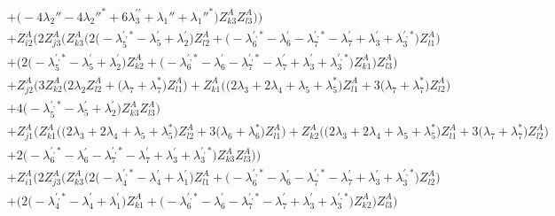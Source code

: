 \begin{align}
 &+\Big(-4 \lambda_2''  -4 \lambda_2''^*  + 6 \lambda^{\prime\prime}_3  + \lambda_1'' + \lambda_1''^*\Big)Z_{{k 3}}^{A} Z_{{l 3}}^{A} \Big)\Big)\nonumber \\ 
 &+Z_{{i 2}}^{A} \Big(2 Z_{{j 3}}^{A} \Big(Z_{{k 3}}^{A} \Big(2 \Big(- \lambda^{{\prime},*}_5  - \lambda^{\prime}_5  + \lambda^{\prime}_2\Big)Z_{{l 2}}^{A}  + \Big(- \lambda^{{\prime},*}_6  - \lambda^{\prime}_6  - \lambda^{{\prime},*}_7  - \lambda^{\prime}_7  + \lambda^{\prime}_3 + \lambda^{{\prime},*}_3\Big)Z_{{l 1}}^{A} \Big)\nonumber \\ 
 &+\Big(2 \Big(- \lambda^{{\prime},*}_5  - \lambda^{\prime}_5  + \lambda^{\prime}_2\Big)Z_{{k 2}}^{A}  + \Big(- \lambda^{{\prime},*}_6  - \lambda^{\prime}_6  - \lambda^{{\prime},*}_7  - \lambda^{\prime}_7  + \lambda^{\prime}_3 + \lambda^{{\prime},*}_3\Big)Z_{{k 1}}^{A} \Big)Z_{{l 3}}^{A} \Big)\nonumber \\ 
 &+Z_{{j 2}}^{A} \Big(3 Z_{{k 2}}^{A} \Big(2 \lambda_2 Z_{{l 2}}^{A}  + \Big(\lambda_7 + \lambda_7^*\Big)Z_{{l 1}}^{A} \Big)+Z_{{k 1}}^{A} \Big(\Big(2 \lambda_3  + 2 \lambda_4  + \lambda_5 + \lambda_5^*\Big)Z_{{l 1}}^{A}  + 3 \Big(\lambda_7 + \lambda_7^*\Big)Z_{{l 2}}^{A} \Big)\nonumber \\ 
 &+4 \Big(- \lambda^{{\prime},*}_5  - \lambda^{\prime}_5  + \lambda^{\prime}_2\Big)Z_{{k 3}}^{A} Z_{{l 3}}^{A} \Big)\nonumber \\ 
 &+Z_{{j 1}}^{A} \Big(Z_{{k 1}}^{A} \Big(\Big(2 \lambda_3  + 2 \lambda_4  + \lambda_5 + \lambda_5^*\Big)Z_{{l 2}}^{A}  + 3 \Big(\lambda_6 + \lambda_6^*\Big)Z_{{l 1}}^{A} \Big)+Z_{{k 2}}^{A} \Big(\Big(2 \lambda_3  + 2 \lambda_4  + \lambda_5 + \lambda_5^*\Big)Z_{{l 1}}^{A}  + 3 \Big(\lambda_7 + \lambda_7^*\Big)Z_{{l 2}}^{A} \Big)\nonumber \\ 
 &+2 \Big(- \lambda^{{\prime},*}_6  - \lambda^{\prime}_6  - \lambda^{{\prime},*}_7  - \lambda^{\prime}_7  + \lambda^{\prime}_3 + \lambda^{{\prime},*}_3\Big)Z_{{k 3}}^{A} Z_{{l 3}}^{A} \Big)\Big)\nonumber \\ 
 &+Z_{{i 1}}^{A} \Big(2 Z_{{j 3}}^{A} \Big(Z_{{k 3}}^{A} \Big(2 \Big(- \lambda^{{\prime},*}_4  - \lambda^{\prime}_4  + \lambda^{\prime}_1\Big)Z_{{l 1}}^{A}  + \Big(- \lambda^{{\prime},*}_6  - \lambda^{\prime}_6  - \lambda^{{\prime},*}_7  - \lambda^{\prime}_7  + \lambda^{\prime}_3 + \lambda^{{\prime},*}_3\Big)Z_{{l 2}}^{A} \Big)\nonumber \\ 
 &+\Big(2 \Big(- \lambda^{{\prime},*}_4  - \lambda^{\prime}_4  + \lambda^{\prime}_1\Big)Z_{{k 1}}^{A}  + \Big(- \lambda^{{\prime},*}_6  - \lambda^{\prime}_6  - \lambda^{{\prime},*}_7  - \lambda^{\prime}_7  + \lambda^{\prime}_3 + \lambda^{{\prime},*}_3\Big)Z_{{k 2}}^{A} \Big)Z_{{l 3}}^{A} \Big)\nonumber \\ 

\end{align}
